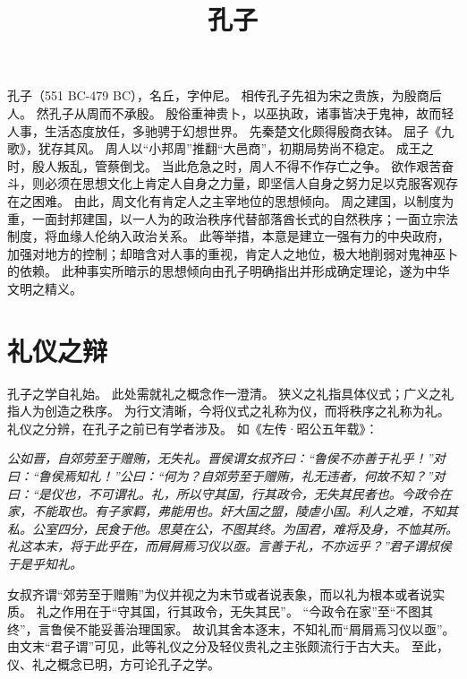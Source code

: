 \documentclass[11pt]{article}
\title{孔子}
\date{}
\begin{document}
  \maketitle

  \newpage
  
  \linenumbers


孔子（551 BC-479 BC），名丘，字仲尼。
相传孔子先祖为宋之贵族，为殷商后人。
然孔子从周而不承殷。
殷俗重神贵卜，以巫执政，诸事皆决于鬼神，故而轻人事，生活态度放任，多驰骋于幻想世界。
先秦楚文化颇得殷商衣钵。
屈子《九歌》，犹存其风。
周人以“小邦周”推翻“大邑商”，初期局势尚不稳定。
成王之时，殷人叛乱，管蔡倒戈。
当此危急之时，周人不得不作存亡之争。
欲作艰苦奋斗，则必须在思想文化上肯定人自身之力量，即坚信人自身之努力足以克服客观存在之困难。
由此，周文化有肯定人之主宰地位的思想倾向。
周之建国，以制度为重，一面封邦建国，以一人为的政治秩序代替部落酋长式的自然秩序；一面立宗法制度，将血缘人伦纳入政治关系。
此等举措，本意是建立一强有力的中央政府，加强对地方的控制；却暗含对人事的重视，肯定人之地位，极大地削弱对鬼神巫卜的依赖。
此种事实所暗示的思想倾向由孔子明确指出并形成确定理论，遂为中华文明之精义。

\newline

\section{礼仪之辩}
孔子之学自礼始。
此处需就礼之概念作一澄清。
狭义之礼指具体仪式；广义之礼指人为创造之秩序。
为行文清晰，今将仪式之礼称为仪，而将秩序之礼称为礼。
礼仪之分辨，在孔子之前已有学者涉及。
如《左传·昭公五年载》：

\textit{公如晋，自郊劳至于赠贿，无失礼。晋侯谓女叔齐曰：“鲁侯不亦善于礼乎！”对曰：“鲁侯焉知礼！”公曰：“何为？自郊劳至于赠贿，礼无违者，何故不知？”对曰：“是仪也，不可谓礼。礼，所以守其国，行其政令，无失其民者也。今政令在家，不能取也。有子家羁，弗能用也。奸大国之盟，陵虐小国。利人之难，不知其私。公室四分，民食于他。思莫在公，不图其终。为国君，难将及身，不恤其所。礼这本末，将于此乎在，而屑屑焉习仪以亟。言善于礼，不亦远乎？”君子谓叔侯于是乎知礼。}

女叔齐谓“郊劳至于赠贿”为仪并视之为末节或者说表象，而以礼为根本或者说实质。
礼之作用在于“守其国，行其政令，无失其民”。
“今政令在家”至“不图其终”，言鲁侯不能妥善治理国家。
故讥其舍本逐末，不知礼而“屑屑焉习仪以亟”。
由文末“君子谓”可见，此等礼仪之分及轻仪贵礼之主张颇流行于古大夫。
至此，仪、礼之概念已明，方可论孔子之学。

\newline
\end{document}
